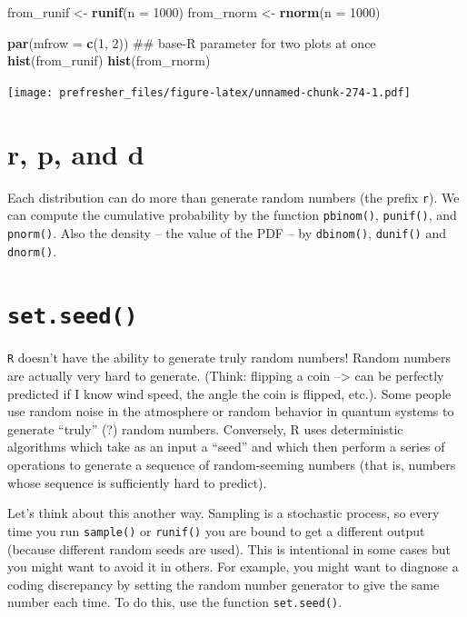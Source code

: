 \documentclass[]{book}
\newenvironment{Shaded}{\begin{snugshade}}{\end{snugshade}}
\newcommand{\KeywordTok}[1]{\textcolor[rgb]{0.13,0.29,0.53}{\textbf{#1}}}
\newcommand{\DataTypeTok}[1]{\textcolor[rgb]{0.13,0.29,0.53}{#1}}
\newcommand{\DecValTok}[1]{\textcolor[rgb]{0.00,0.00,0.81}{#1}}
\newcommand{\StringTok}[1]{\textcolor[rgb]{0.31,0.60,0.02}{#1}}
\newcommand{\NormalTok}[1]{#1}
\theoremstyle{definition}
\theoremstyle{definition}
\theoremstyle{definition}
\theoremstyle{remark}
\begin{document}
\begin{Shaded}
\begin{Highlighting}[]
\NormalTok{from_runif <-}\StringTok{ }\KeywordTok{runif}\NormalTok{(}\DataTypeTok{n =} \DecValTok{1000}\NormalTok{)}
\NormalTok{from_rnorm <-}\StringTok{ }\KeywordTok{rnorm}\NormalTok{(}\DataTypeTok{n =} \DecValTok{1000}\NormalTok{)}

\KeywordTok{par}\NormalTok{(}\DataTypeTok{mfrow =} \KeywordTok{c}\NormalTok{(}\DecValTok{1}\NormalTok{, }\DecValTok{2}\NormalTok{)) ## base-R parameter for two plots at once}
\KeywordTok{hist}\NormalTok{(from_runif)}
\KeywordTok{hist}\NormalTok{(from_rnorm)}
\end{Highlighting}
\end{Shaded}

\texttt{[image: prefresher\_files/figure-latex/unnamed-chunk-274-1.pdf]}

\section{r, p, and d}\label{r-p-and-d}

Each distribution can do more than generate random numbers (the prefix
\texttt{r}). We can compute the cumulative probability by the function
\texttt{pbinom()}, \texttt{punif()}, and \texttt{pnorm()}. Also the
density -- the value of the PDF -- by \texttt{dbinom()},
\texttt{dunif()} and \texttt{dnorm()}.

\section{\texorpdfstring{\texttt{set.seed()}}{set.seed()}}\label{set.seed}

\texttt{R} doesn't have the ability to generate truly random numbers!
Random numbers are actually very hard to generate. (Think: flipping a
coin --\textgreater{} can be perfectly predicted if I know wind speed,
the angle the coin is flipped, etc.). Some people use random noise in
the atmosphere or random behavior in quantum systems to generate
``truly'' (?) random numbers. Conversely, R uses deterministic
algorithms which take as an input a ``seed'' and which then perform a
series of operations to generate a sequence of random-seeming numbers
(that is, numbers whose sequence is sufficiently hard to predict).

Let's think about this another way. Sampling is a stochastic process, so
every time you run \texttt{sample()} or \texttt{runif()} you are bound
to get a different output (because different random seeds are used).
This is intentional in some cases but you might want to avoid it in
others. For example, you might want to diagnose a coding discrepancy by
setting the random number generator to give the same number each time.
To do this, use the function \texttt{set.seed()}.
\end{document}

